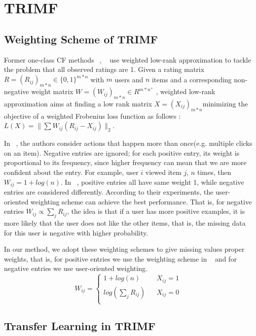 \section{TRIMF}
\subsection{Weighting Scheme of TRIMF}
  \par{Former one-class CF methods ~\cite{4781121}, ~\cite{4781145} use weighted low-rank approximation to tackle the problem that all observed ratings are 1. Given a rating matrix $R = (R_{ij})_{m*n} \in \{0, 1\}^{m*n}$ with $m$ users and $n$ items and a corresponding non-negative weight matrix $W = (W_{ij})_{m*n} \in R^{m*n^+}$ , weighted low-rank approximation aims at finding a low rank matrix $X = (X_{ij})_{m*n} $minimizing the objective of a weighted Frobenius loss function as follows : $L(X) = \|\sum W_{ij}(R_{ij} - X_{ij})\|_2$. 

In ~\cite{4781121}, the authors consider actions that happen more than once(e.g. multiple clicks on an item). Negative entries are ignored; for each positive entry, its weight is proportional to its frequency, since higher frequency can mean that we are more confident about the entry. For example, user $i$ viewed item $j$, $n$ times, then $W_{ij} = 1 + log(n)$. In ~\cite{4781145}, positive entries all have same weight 1, while negative entries are considered differently. According to their experiments, the user-oriented weighting scheme can achieve the best performance. That is, for negative entries $W_{ij} \propto \sum_j{R_{ij}}$, the idea is that if a user has more positive examples, it is more likely that the user does not like the other items, that is, the missing data for this user is negative with higher probability.

In our method, we adopt these weighting schemes to give missing values proper weights, that is, for positive entries we use the weighting scheme in ~\cite{4781121} and for negative entries we use user-oriented weighting. $$ W_{ij}=\left\{
\begin{aligned}
1 + log(n) & & X_{ij} = 1\\
log(\sum_j{R_{ij}}) &  & X_{ij} = 0 \\
\end{aligned}
\right.
$$}
\subsection{Transfer Learning in TRIMF}

